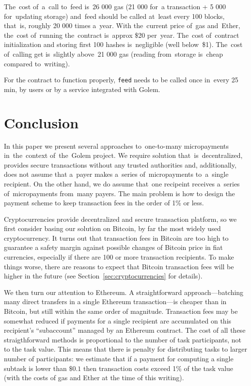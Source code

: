 \documentclass[a4paper]{article}
\begin{document}
    The~cost of~a~call to~feed is~26 000 gas (21 000 for~a transaction + 5 000 for~updating storage) and~feed should
    be called at~least every 100 blocks, that~is, roughly 20 000 times a~year. With the~current price of~gas
    and~Ether, the~cost of~running the~contract is~approx \$20 per~year. The~cost of~contract initialization and
    storing first 100 hashes is~negligible (well below~\$1). The~cost of~calling get is~slightly above~21 000 gas
    (reading from~storage is~cheap compared to~writing).

    For the contract to function properly, \texttt{feed} needs to be called once in~every 25 min, by users or
    by a service integrated with Golem.

\section{Conclusion}
\label{sec:conclusion}    
    In this paper we present several approaches to~one-to-many micropayments in~the~context of~the~Golem
    project. We require solution that~is~decentralized, provides secure transactions without any trusted authorities
    and, additionally, does not assume that a~payer makes a~series of~micropayments to~a~single recipient.
    On the other hand, we do assume that~one recipeint receives a~series of~micropayments from~many payers.
    The main problem is how to design the payment scheme to keep transaction fees in the order of 1\% or less.

    Cryptocurrencies provide decentralized and secure transaction platform, so we first consider basing our solution
    on Bitcoin, by far the most widely used cryptocurrency. It turns out that transaction fees in Bitcoin
    are too high to guarantee a safety margin against possible changes of Bitcoin price in fiat currencies, especially
    if there are 100 or more transaction recipients. To make things worse, there are reasons to expect that
    Bitcoin transaction fees will be higher in the future (see Section~\ref{sec:cryptocurrencies} for details).
    
    We then turn our attention to Ethereum. A straightforward approach---batching many direct transfers in a
    single Ethereum transaction---is cheaper than in Bitcoin, but still within the same order of magnitude.
    Transaction fees may be somewhat reduced if payments for a single recipient are accumulated on this
    recipient's ``subaccount'' managed by an Ethereum contract. The cost of all these straigthforward methods
    is proportional to the number of task participants, not to the task value. This means that there is penalty
    for distributing tasks to larger number of participants: we estimate that if a payment for computing a single
    subtask is lower than $\$0.1$ then transaction costs exceed 1\% of the task value (with the costs of gas and
    Ether at the time of this writing).
\end{document}
